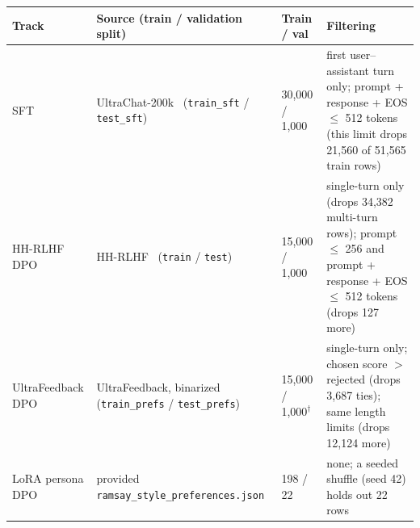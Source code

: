 \begingroup\tablefont\renewcommand{\arraystretch}{1.0}
\begin{tabularx}{\textwidth}{>{\raggedright\arraybackslash}p{2.15cm}>{\raggedright\arraybackslash}p{4.3cm}p{2.2cm}>{\raggedright\arraybackslash}X}
\toprule
Track & Source (train / validation split) & Train / val & Filtering \\
\midrule
SFT & UltraChat-200k~\citep{ding2023ultrachat} (\texttt{train\_\allowbreak{}sft} / \texttt{test\_\allowbreak{}sft}) & 30,000 / 1,000 & first user--assistant turn only; prompt + response + EOS $\le$ 512 tokens (this limit drops 21,560 of 51,565 train rows) \\
HH-RLHF DPO & HH-RLHF~\citep{bai2022hh} (\texttt{train} / \texttt{test}) & 15,000 / 1,000 & single-turn only (drops 34,382 multi-turn rows); prompt $\le$ 256 and prompt + response + EOS $\le$ 512 tokens (drops 127 more) \\
UltraFeedback DPO & UltraFeedback, binarized~\citep{cui2023ultrafeedback,tunstall2023zephyr} (\texttt{train\_\allowbreak{}prefs} / \texttt{test\_\allowbreak{}prefs}) & 15,000 / 1,000$^\dagger$ & single-turn only; chosen score $>$ rejected (drops 3,687 ties); same length limits (drops 12,124 more) \\
LoRA persona DPO & provided \texttt{ramsay\_\allowbreak{}style\_\allowbreak{}preferences.json} & 198 / 22 & none; a seeded shuffle (seed 42) holds out 22 rows \\
\bottomrule
\end{tabularx}
\endgroup
